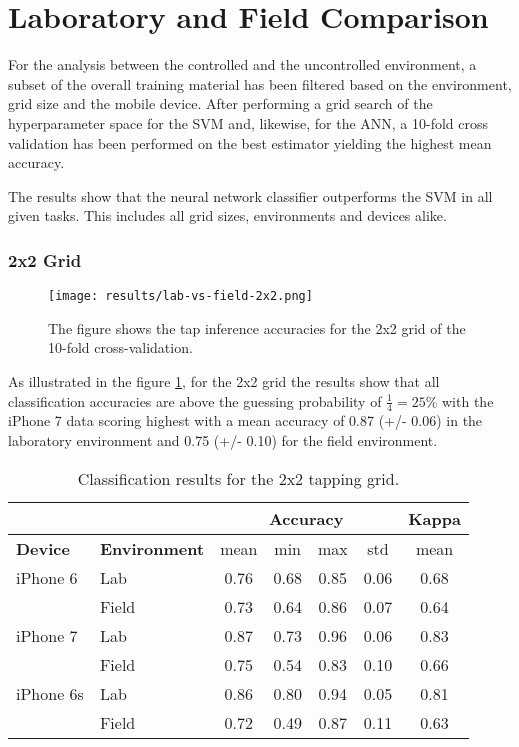 \section{Laboratory and Field Comparison}
For the analysis between the controlled and the uncontrolled environment, a subset of the overall training material has been filtered based on the environment, grid size and the mobile device. After performing a grid search of the hyperparameter space for the SVM and, likewise, for the ANN, a 10-fold cross validation has been performed on the best estimator yielding the highest mean accuracy.

The results show that the neural network classifier outperforms the SVM in all given tasks. This includes all grid sizes, environments and devices alike.

\subsubsection{2x2 Grid}

\begin{figure}[h!]
  \centering
  \texttt{[image: results/lab-vs-field-2x2.png]}
  \caption{The figure shows the tap inference accuracies for the 2x2 grid of the 10-fold cross-validation.} \label{fig:lab2x2}
\end{figure}

As illustrated in the figure \ref{fig:lab2x2}, for the 2x2 grid the results show that all classification accuracies are above the guessing probability of $\frac{1}{4} = 25\%$ with the iPhone 7 data scoring highest with a mean accuracy of 0.87 (+/- 0.06) in the laboratory environment and 0.75 (+/- 0.10) for the field environment.

\begin{table}[h!]
  \centering
\begin{tabular}{|l|l|c|c|c|c|c|}
  \cline{3-7}
  \multicolumn{2}{c}{} & \multicolumn{4}{|c|}{\textbf{Accuracy}} & \textbf{Kappa} \\
  \hline
  \textbf{Device} & \textbf{Environment} & mean &   min &   max  & std &  mean \\
  \hline
  iPhone 6 & Lab &      0.76 &     0.68 &     0.85 &     0.06 &        0.68 \\
  & Field &      0.73 &     0.64 &     0.86 &     0.07 &        0.64 \\
  \hline
iPhone 7 & Lab &      0.87 &     0.73 &     0.96 &     0.06 &        0.83 \\
  & Field &      0.75 &     0.54 &     0.83 &     0.10 &        0.66 \\
  \hline
iPhone 6s & Lab &      0.86 &     0.80 &     0.94 &     0.05 &        0.81 \\
  & Field &      0.72 &     0.49 &     0.87 &     0.11 &        0.63 \\
  \hline
\end{tabular}
  \caption{Classification results for the 2x2 tapping grid.}
\end{table}

